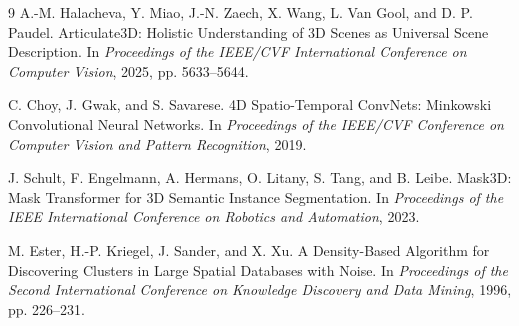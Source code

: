 \documentclass[11pt]{article}
\begin{document}
\begin{thebibliography}{9}
A.-M. Halacheva, Y. Miao, J.-N. Zaech, X. Wang, L. Van Gool, and D. P. Paudel.
\newblock Articulate3D: Holistic Understanding of 3D Scenes as Universal Scene
Description.
\newblock In \emph{Proceedings of the IEEE/CVF International Conference on
Computer Vision}, 2025, pp. 5633--5644.

C. Choy, J. Gwak, and S. Savarese.
\newblock 4D Spatio-Temporal ConvNets: Minkowski Convolutional Neural Networks.
\newblock In \emph{Proceedings of the IEEE/CVF Conference on Computer Vision
and Pattern Recognition}, 2019.

J. Schult, F. Engelmann, A. Hermans, O. Litany, S. Tang, and B. Leibe.
\newblock Mask3D: Mask Transformer for 3D Semantic Instance Segmentation.
\newblock In \emph{Proceedings of the IEEE International Conference on
Robotics and Automation}, 2023.

M. Ester, H.-P. Kriegel, J. Sander, and X. Xu.
\newblock A Density-Based Algorithm for Discovering Clusters in Large Spatial
Databases with Noise.
\newblock In \emph{Proceedings of the Second International Conference on
Knowledge Discovery and Data Mining}, 1996, pp. 226--231.
\end{thebibliography}
\end{document}
